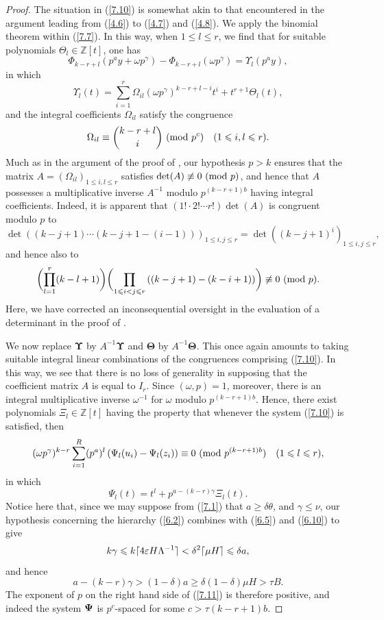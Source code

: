 \documentclass[12pt,reqno]{amsart}
\theoremstyle{definition}
\theoremstyle{remark}
\numberwithin{equation}{section}
\newcommand{\mmod}[1]{\,\,(\text{\rm mod}\,\,#1)}
\def\dbZ{{\mathbb Z}}\def\dbQ{{\mathbb Q}}
\def\gam{{\gamma}} \def\Gam{{\Gamma}}
\def\del{{\delta}} \def\Del{{\Delta}} \def\Deltil{{\widetilde \Delta}}
\def\tet{{\theta}} \def\bftet{{\boldsymbol \theta}}
\def\Tet{{\Theta}} \def\bfTet{{\boldsymbol \Tet}}
\def\Ups{{\Upsilon}} \def\Upshat{{\widehat \Ups}}\def\bfUps{{\boldsymbol \Ups}}
\def\ome{{\omega}} \def\Ome{{\Omega}}
\def\eps{\varepsilon}
\def\le{\leqslant} \def\ge{\geqslant} \def\pleq{\preccurlyeq} \def\ple{\prec}
\begin{document}
\begin{proof}
\par The situation in (\ref{7.10}) is somewhat akin to that encountered in the argument 
leading from (\ref{4.6}) to (\ref{4.7}) and (\ref{4.8}). We apply the binomial theorem within 
(\ref{7.7}). In this way, when $1\le l\le r$, we find that for suitable polynomials 
$\Tet_l\in \dbZ[t]$, one has
$$\Phi_{k-r+l}(p^ay+\ome p^\gam)-\Phi_{k-r+l}(\ome p^\gam)=\Ups_l(p^ay),$$
in which
$$\Ups_l(t)=\sum_{i=1}^r\Ome_{il}(\ome p^\gam)^{k-r+l-i}t^i+t^{r+1}\Tet_l(t),$$
and the integral coefficients $\Ome_{il}$ satisfy the congruence
$$\Ome_{il}\equiv \binom {k-r+l}{i}\mmod{p^c}\quad (1\le i,l\le r).$$
Much as in the argument of the proof of \cite[Lemma 3.2]{Woo2013}, our hypothesis $p>k$ 
ensures that the matrix $A=(\Ome_{il})_{1\le i,l\le r}$ satisfies 
$\det(A)\not\equiv 0\mmod{p}$, and hence that $A$ possesses a multiplicative inverse 
$A^{-1}$ modulo $p^{(k-r+1)b}$ having integral coefficients. Indeed, it is apparent that 
$(1!\cdot 2!\cdots r!)\det(A)$ is congruent modulo $p$ to
$$\det \left( (k-j+1)\cdots (k-j+1-(i-1))\right)_{1\le i,j\le r}=
\det \left( (k-j+1)^i\right)_{1\le i,j\le r},$$
and hence also to
$$\biggl( \prod_{l=1}^r(k-l+1)\biggr) \biggl( \prod_{1\le i<j\le r}\left( (k-j+1)-(k-i+1)
\right) \biggr) \not\equiv 0\mmod{p}.$$
Here, we have corrected an inconsequential oversight in the evaluation of a determinant in 
the proof of \cite[Lemma 3.2]{Woo2013}.\par

We now replace $\bfUps$ by $A^{-1}\bfUps$ and $\bfTet$ by $A^{-1}\bfTet$. This once 
again amounts to taking suitable integral linear combinations of the congruences comprising 
(\ref{7.10}). In this way, we see that there is no loss of generality in supposing that the 
coefficient matrix $A$ is equal to $I_r$. Since $(\ome,p)=1$, moreover, there is an integral 
multiplicative inverse $\ome^{-1}$ for $\ome$ modulo $p^{(k-r+1)b}$. Hence, there exist 
polynomials $\Xi_l\in \dbZ[t]$ having the property that whenever the system (\ref{7.10}) is 
satisfied, then
$$(\ome p^\gam)^{k-r}\sum_{i=1}^R(p^a)^l\left( \Psi_l(u_i)-\Psi_l(z_i)\right) \equiv 0
\mmod{p^{(k-r+1)b}}\quad (1\le l\le r),$$
in which
\begin{equation}\label{7.11}
\Psi_l(t)=t^l+p^{a-(k-r)\gam}\Xi_l(t).
\end{equation}
Notice here that, since we may suppose from (\ref{7.1}) that $a\ge \del \tet$, and 
$\gam\le \nu$, our hypothesis concerning the hierarchy (\ref{6.2}) combines with (\ref{6.5}) 
and (\ref{6.10}) to give
$$k\gam\le k\lceil 4\eps H\Lam^{-1}\rceil <\del^2\lceil \mu H\rceil \le \del a,$$
and hence
$$a-(k-r)\gam>(1-\del)a\ge \del(1-\del)\mu H>\tau B.$$
The exponent of $p$ on the right hand side of (\ref{7.11}) is therefore positive, and indeed 
the system ${\boldsymbol \Psi}$ is $p^c$-spaced for some $c>\tau(k-r+1)b$.\par


\end{proof}
\end{document}
